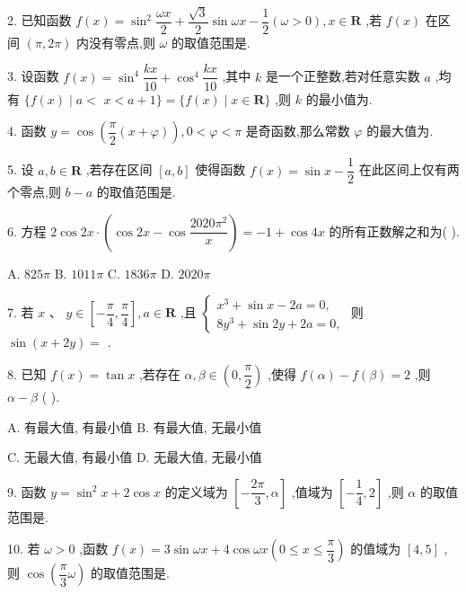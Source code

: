 2. 已知函数 $f\left( x\right)  = {\sin }^{2}\dfrac{\omega x}{2} + \dfrac{\sqrt{3}}{2}\sin {\omega x} - \dfrac{1}{2}\left( {\omega  > 0}\right) ,x \in  \mathbf{R}$ ,若 $f\left( x\right)$ 在区间 $\left( {\pi ,{2\pi }}\right)$ 内没有零点,则 $\omega$ 的取值范围是\blkda{}.

3. 设函数 $f\left( x\right)  = {\sin }^{4}\dfrac{kx}{10} + {\cos }^{4}\dfrac{kx}{10}$ ,其中 $k$ 是一个正整数,若对任意实数 $a$ ,均有 $\{ f\left( x\right)  \mid  a <$  $x < a + 1\}  = \{ f\left( x\right)  \mid  x \in  \mathbf{R}\}$ ,则 $k$ 的最小值为\blkda{}.

4. 函数 $y = \cos \left( {\dfrac{\pi }{2}\left( {x + \varphi }\right) }\right) ,0 < \varphi  < \pi$ 是奇函数,那么常数 $\varphi$ 的最大值为\blkda{}.

5. 设 $a,b \in  \mathbf{R}$ ,若存在区间 $\left\lbrack  {a,b}\right\rbrack$ 使得函数 $f\left( x\right)  = \sin x - \dfrac{1}{2}$ 在此区间上仅有两个零点,则 $b - a$ 的取值范围是\blkda{}.

6. 方程 $2\cos {2x} \cdot  \left( {\cos {2x} - \cos \dfrac{{2020}{\pi }^{2}}{x}}\right)  =  - 1 + \cos {4x}$ 的所有正数解之和为(   ).

A. ${825\pi }$ B. ${1011\pi }$ C. ${1836\pi }$ D. ${2020\pi }$

7. 若 $x\text{ 、 }y \in  \left\lbrack  {-\dfrac{\pi }{4},\dfrac{\pi }{4}}\right\rbrack  ,a \in  \mathbf{R}$ ,且 $\left\{  \begin{array}{l} {x}^{3} + \sin x - {2a} = 0, \\  8{y}^{3} + \sin {2y} + {2a} = 0, \end{array}\right.$ 则 $\sin \left( {x + {2y}}\right)  =$ \blkda{}.

8. 已知 $f\left( x\right)  = \tan x$ ,若存在 $\alpha ,\beta  \in  \left( {0,\dfrac{\pi }{2}}\right)$ ,使得 $f\left( \alpha \right)  - f\left( \beta \right)  = 2$ ,则 $\alpha  - \beta$ (   ).

A. 有最大值, 有最小值 B. 有最大值, 无最小值

C. 无最大值, 有最小值 D. 无最大值, 无最小值

9. 函数 $y = {\sin }^{2}x + 2\cos x$ 的定义域为 $\left\lbrack  {-\dfrac{2\pi }{3},\alpha }\right\rbrack$ ,值域为 $\left\lbrack  {-\dfrac{1}{4},2}\right\rbrack$ ,则 $\alpha$ 的取值范围是\blkda{}.

10. 若 $\omega  > 0$ ,函数 $f\left( x\right)  = 3\sin {\omega x} + 4\cos {\omega x}\left( {0 \leq  x \leq  \dfrac{\pi }{3}}\right)$ 的值域为 $\left\lbrack  {4,5}\right\rbrack$ ,则 $\cos \left( {\dfrac{\pi }{3}\omega }\right)$ 的取值范围是\blkda{}.


